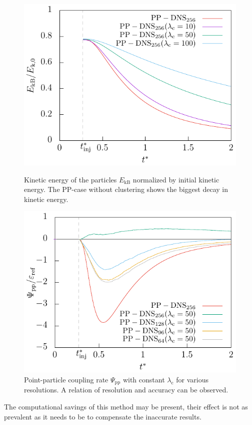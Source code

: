 \documentclass[11pt,a4paper,openany,oneside,parskip=half*]{article}
\begin{document}
\begin{figure}[h]
    \centering
    \begin{minipage}[t]{.5\textwidth}
         \centering
        \includegraphics[width=\linewidth]{./Abbildungen/256/particlekineticenergy_time.pdf}
        \caption{Kinetic energy of the particles $E_\mathrm{kB}$ normalized by initial kinetic energy. The PP-case without clustering shows the biggest decay in kinetic energy. }
        \label{particlekineticenergy_time_256}
    \end{minipage}%
    \begin{minipage}[t]{0.5\textwidth}
        \centering
        \includegraphics[width=\linewidth]{./Abbildungen/vergleich_coupling_time.pdf}
        \caption{Point-particle coupling rate $\Psi_\mathrm{pp}$ with constant $\lambda_\mathrm{c}$ for various resolutions. A relation of resolution and accuracy can be observed.}
        \label{vergleich_coupling_time_256}
    \end{minipage}
\end{figure}
\newline
The computational savings of this method may be present, their effect is not as prevalent as it needs to be to compensate the inaccurate results.
\pagebreak
\end{document}
